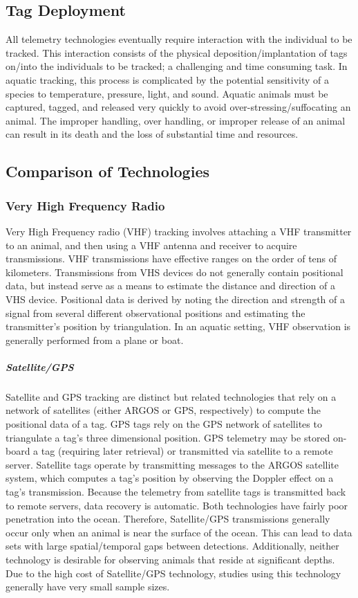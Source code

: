 \subsection{Tag Deployment}
All telemetry technologies eventually require interaction with the individual to be tracked.  This interaction consists of the physical deposition/implantation of tags on/into the individuals to be tracked; a challenging and time consuming task.  In aquatic tracking, this process is complicated by the potential sensitivity of a species to temperature, pressure, light, and sound.  Aquatic animals must be captured, tagged, and released very quickly to avoid over-stressing/suffocating an animal.  The improper handling, over handling, or improper release of an animal can result in its death and the loss of substantial time and resources.  

\subsection{Comparison of Technologies}
\subsubsection{Very High Frequency Radio}
Very High Frequency radio (VHF) tracking involves attaching a VHF transmitter to an animal, and then using a VHF antenna and receiver to acquire transmissions.  VHF transmissions have effective ranges on the order of tens of kilometers.  Transmissions from VHS devices do not generally contain positional data, but instead serve as a means to estimate the distance and direction of a VHS device.  Positional data is derived by noting the direction and strength of a signal from several different observational positions and estimating the transmitter's position by triangulation\cite{USDA}.  In an aquatic setting, VHF observation is generally performed from a plane or boat\cite{Wikipedia_RadioTracking}.

\subparagraph{Satellite/GPS}
Satellite and GPS tracking are distinct but related technologies that rely on a network of satellites (either ARGOS or GPS, respectively) to compute the positional data of a tag. GPS tags rely on the GPS network of satellites to triangulate a tag's three dimensional position. GPS telemetry may be stored on-board a tag (requiring later retrieval) or transmitted via satellite to a remote server\cite{USDA}. Satellite tags operate by transmitting messages to the ARGOS satellite system, which computes a tag's position by observing the Doppler effect on a tag's transmission\cite{ARGOS}.  Because the telemetry from satellite tags is transmitted back to remote servers, data recovery is automatic.  Both technologies have fairly poor penetration into the ocean.  Therefore, Satellite/GPS transmissions generally occur only when an animal is near the surface of the ocean.  This can lead to data sets with large spatial/temporal gaps between detections.  Additionally, neither technology is desirable for observing animals that reside at significant depths.  Due to the high cost of Satellite/GPS technology, studies using this technology generally have very small sample sizes.  

